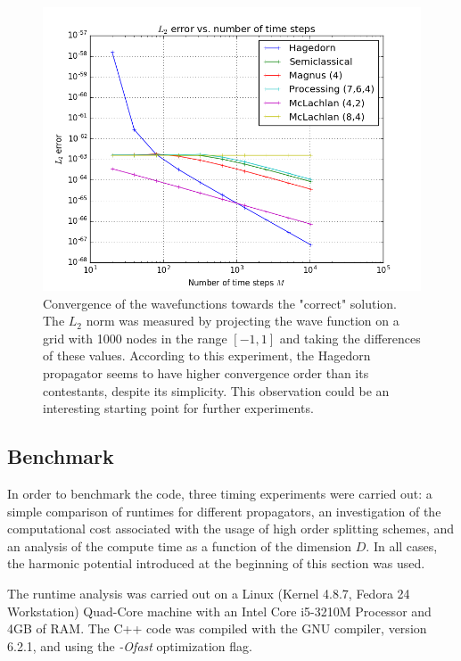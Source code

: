 \begin{figure}[ht]
	\centering
	\includegraphics[width=.8\textwidth]{figures/error_analysis.png}
	\caption{Convergence of the wavefunctions towards the "correct" solution. The $L_2$ norm was measured by projecting the wave function on a grid with 1000 nodes in the range $[-1,1]$ and taking the differences of these values. According to this experiment, the Hagedorn propagator seems to have higher convergence order than its contestants, despite its simplicity.
	This observation could be an interesting starting point for further experiments.}
	\label{fig:error_analysis}
\end{figure}

\subsection{Benchmark}
\label{subsec:benchmark}
%
In order to benchmark the code, three timing experiments were carried out: a simple comparison of runtimes for different propagators, an investigation of the computational cost associated with the usage of high order splitting schemes, and an analysis of the compute time as a function of the dimension $D$.
In all cases, the harmonic potential introduced at the beginning of this section was used.
\par\medskip
%
The runtime analysis was carried out on a Linux (Kernel 4.8.7, Fedora 24 Workstation) Quad-Core machine with an Intel Core i5-3210M Processor and
4GB of RAM. The C++ code was compiled with the GNU compiler, version 6.2.1, and using the \emph{-Ofast} optimization flag.




